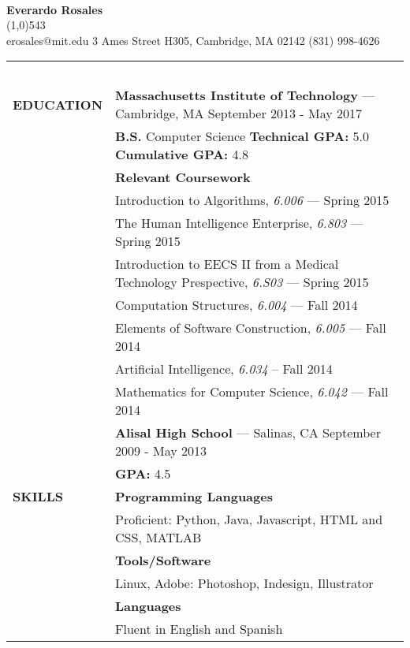 \documentclass[11pt,letterpaper]{article}
\begin{document}
\raggedright
\ \\

\textbf{\huge{Everardo Rosales}}\hfill
{}\
\\
\vspace{-8pt}
\line(1,0){543}\\
erosales@mit.edu \hfill 3 Ames Street H305, Cambridge, MA 02142 \hfill (831)
998-4626\\
\vspace{5pt}

\begin{tabular}{@{}lp{6.6in}}
\ \\
\textbf{EDUCATION}
&\textbf{Massachusetts Institute of Technology} --- Cambridge, MA \hfill September 2013 - May 2017\\
&\textbf{B.S.} Computer Science \qquad \textbf{Technical GPA:} 5.0 \qquad \textbf{Cumulative GPA:} 4.8\\
&\textbf{Relevant Coursework}\\
&\hspace{10pt} Introduction to Algorithms, \emph{6.006} --- Spring 2015 \\
&\hspace{10pt} The Human Intelligence Enterprise, \emph{6.803} --- Spring 2015 \\
&\hspace{10pt} Introduction to EECS II from a Medical Technology Prespective, \emph{6.S03} --- Spring 2015 \\

&\hspace{10pt} Computation Structures, \emph{6.004} --- Fall 2014 \\
&\hspace{10pt} Elements of Software Construction, \emph{6.005} --- Fall 2014\\
&\hspace{10pt} Artificial Intelligence, \emph{6.034} -- Fall 2014 \\
&\hspace{10pt} Mathematics for Computer Science, \emph{6.042} --- Fall 2014\\

&\textbf{Alisal High School} --- Salinas, CA \hfill September 2009 - May 2013\\
&\textbf{GPA:} 4.5\\

\textbf{SKILLS}
&\textbf{Programming Languages}\\
&\hspace{10pt}Proficient: Python, Java, Javascript, HTML and CSS, MATLAB\\
&\textbf{Tools/Software}\\
&\hspace{10pt}Linux, Adobe: Photoshop, Indesign, Illustrator\\
&\textbf{Languages}\\
&\hspace{10pt}Fluent in English and Spanish\\


\end{tabular}
\end{document}
